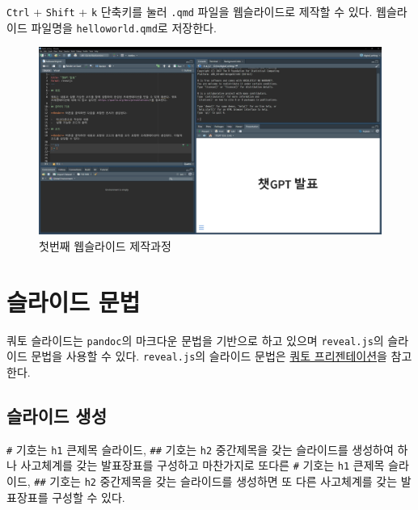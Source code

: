 \documentclass[
  letterpaper,
]{book}
\begin{document}
\texttt{Ctrl} + \texttt{Shift} + \texttt{k} 단축키를 눌러 \texttt{.qmd}
파일을 웹슬라이드로 제작할 수 있다. 웹슬라이드 파일명을
\texttt{helloworld.qmd}로 저장한다.

\begin{figure}

{\centering \includegraphics{images/dw_slide_helloworld.jpg}

}

\caption{첫번째 웹슬라이드 제작과정}

\end{figure}

\hypertarget{uxc2acuxb77cuxc774uxb4dc-uxbb38uxbc95}{%
\section{슬라이드 문법}\label{uxc2acuxb77cuxc774uxb4dc-uxbb38uxbc95}}

쿼토 슬라이드는 \texttt{pandoc}의 마크다운 문법을 기반으로 하고 있으며
\texttt{reveal.js}의 슬라이드 문법을 사용할 수 있다.
\texttt{reveal.js}의 슬라이드 문법은
\href{https://quarto.org/docs/presentations/}{쿼토 프리젠테이션}을
참고한다.

\hypertarget{uxc2acuxb77cuxc774uxb4dc-uxc0dduxc131}{%
\subsection{슬라이드 생성}\label{uxc2acuxb77cuxc774uxb4dc-uxc0dduxc131}}

\texttt{\#} 기호는 \texttt{h1} 큰제목 슬라이드, \texttt{\#\#} 기호는
\texttt{h2} 중간제목을 갖는 슬라이드를 생성하여 하나 사고체계를 갖는
발표장표를 구성하고 마찬가지로 또다른 \texttt{\#} 기호는 \texttt{h1}
큰제목 슬라이드, \texttt{\#\#} 기호는 \texttt{h2} 중간제목을 갖는
슬라이드를 생성하면 또 다른 사고체계를 갖는 발표장표를 구성할 수 있다.
\end{document}
